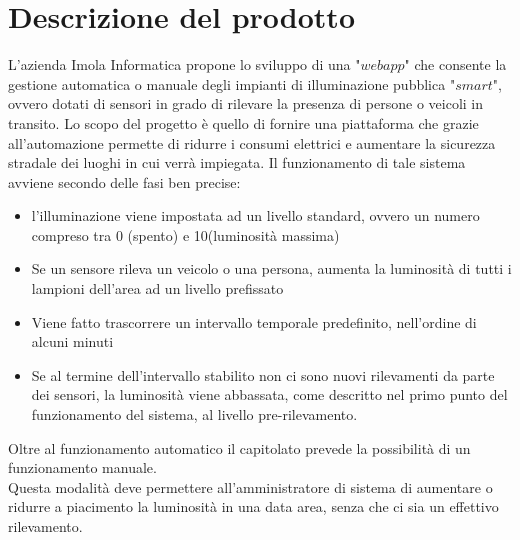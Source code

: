 \documentclass[12pt]{article}
\begin{document}
\section{Descrizione del prodotto}
L'azienda Imola Informatica propone lo sviluppo di una "$webapp$" che consente la gestione automatica o manuale degli impianti di illuminazione pubblica "$smart$", ovvero dotati di sensori in grado di rilevare la presenza di persone o veicoli in transito.
Lo scopo del progetto è quello di fornire una piattaforma che grazie all'automazione permette di ridurre i consumi elettrici e aumentare la sicurezza stradale dei luoghi in cui verrà impiegata.
Il funzionamento di tale sistema avviene secondo delle fasi ben precise:
\begin{itemize}
	\item l'illuminazione viene impostata ad un livello standard, ovvero un numero compreso tra 0 (spento) e 10(luminosità massima)
	\item Se un sensore rileva un veicolo o una persona, aumenta la luminosità di tutti i lampioni dell'area ad un livello prefissato
	\item Viene fatto trascorrere un intervallo temporale predefinito, nell'ordine di alcuni minuti
	\item Se al termine dell'intervallo stabilito non ci sono nuovi rilevamenti da parte dei sensori, la luminosità viene abbassata, come descritto nel primo punto del funzionamento del sistema, al livello pre-rilevamento.
\end{itemize}
Oltre al funzionamento automatico il capitolato prevede la possibilità di un funzionamento manuale. \\
Questa modalità deve permettere all'amministratore di sistema di aumentare o ridurre a piacimento la luminosità in una data area, senza che ci sia un effettivo rilevamento.
\end{document}
